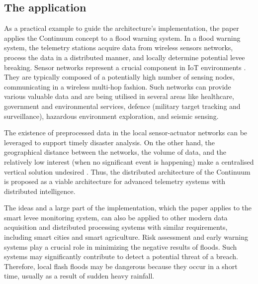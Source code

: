 \subsection{The application}

As a practical example to guide the architecture's implementation, the paper applies the Continuum concept to a flood warning system. In a flood warning system, the telemetry stations acquire data from wireless sensors networks, process the data in a distributed manner, and locally determine potential levee breaking. Sensor networks represent a crucial component in IoT environments \cite{yu2017survey}. They are typically composed of a potentially high number of sensing nodes, communicating in a wireless multi-hop fashion. Such networks can provide various valuable data and are being utilised in several areas like healthcare, government and environmental services, defence (military target tracking and surveillance), hazardous environment exploration, and seismic sensing.

The existence of preprocessed data in the local sensor-actuator networks can be leveraged to support timely disaster analysis. On the other hand, the geographical distance between the networks, the volume of data, and the relatively low interest (when no significant event is happening) make a centralised vertical solution undesired \cite{balouek2019towards}. Thus, the distributed architecture of the Continuum is proposed as a viable architecture for advanced telemetry systems with distributed intelligence.

The ideas and a large part of the implementation, which the paper applies to the smart levee monitoring system, can also be applied to other modern data acquisition and distributed processing systems with similar requirements, including smart cities and smart agriculture. Risk assessment and early warning systems play a crucial role in minimizing the negative results of floods. Such systems may significantly contribute to detect a potential threat of a breach. Therefore, local flash floods may be dangerous because they occur in a short time, usually as a result of sudden heavy rainfall.

